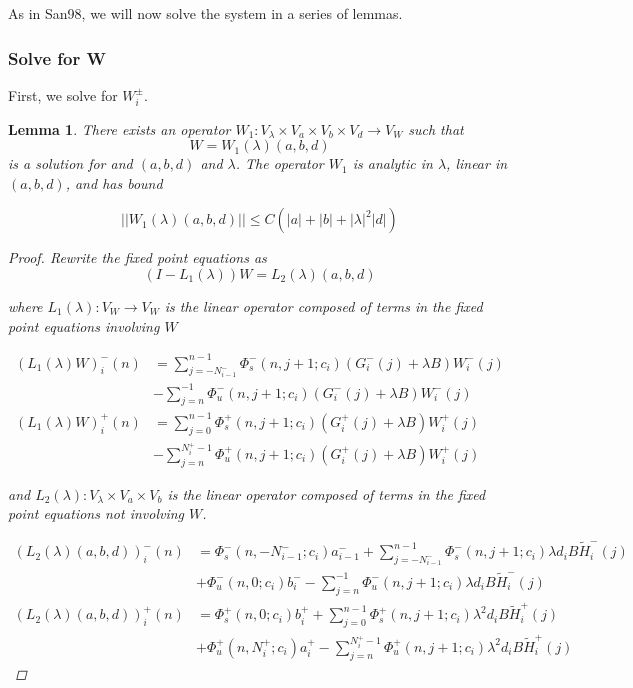 \documentclass[12pt]{article}
\newtheorem{lemma}{Lemma}
\begin{document}
As in San98, we will now solve the system in a series of lemmas.

\subsubsection{Solve for W}

First, we solve for $W_i^\pm$. 


\begin{lemma}\label{inv1}
There exists an operator $W_1: V_\lambda \times V_a \times V_b \times V_d \rightarrow V_W$ such that
\[
W = W_1(\lambda)(a,b,d)
\]
is a solution for and $(a,b,d)$ and $\lambda$. The operator $W_1$ is analytic in $\lambda$, linear in $(a,b,d)$, and has bound

\begin{equation}\label{W1bound}
||W_1(\lambda)(a,b,d)|| \leq C \left( |a| + |b| + |\lambda|^2 |d| \right)
\end{equation}

\begin{proof}
Rewrite the fixed point equations as
\[
(I - L_1(\lambda))W = L_2(\lambda)(a,b,d)
\]

where $L_1(\lambda): V_W \rightarrow V_W$ is the linear operator composed of terms in the fixed point equations involving $W$

\begin{align*}
(L_1(\lambda)W)_i^-(n) &= \sum_{j = -N_{i-1}^-}^{n-1} \Phi_s^-(n, j+1; c_i)
(G_i^-(j) + \lambda B) W_i^-(j) \\&- \sum_{j = n}^{-1} \Phi_u^-(n, j+1; c_i) 
(G_i^-(j) + \lambda B) W_i^-(j)\\
(L_1(\lambda)W)_i^+(n) &= \sum_{j = 0}^{n-1} \Phi_s^+(n, j+1; c_i) 
(G_i^+(j) + \lambda B) W_i^+(j) \\
&-\sum_{j = n}^{N_i^+-1} \Phi_u^+(n, j+1; c_i) 
(G_i^+(j) + \lambda B) W_i^+(j)
\end{align*}

and $L_2(\lambda): V_\lambda \times V_a \times V_b $ is the linear operator composed of terms in the fixed point equations not involving $W$.

\begin{align*}
(L_2(\lambda)(a,b,d))_i^-(n) &= 
\Phi_s^-(n, -N_{i-1}^-; c_i) a_{i-1}^- + \sum_{j = -N_{i-1}^-}^{n-1} \Phi_s^-(n, j+1; c_i)
\lambda d_i B \tilde{H}_i^-(j)
 \\
&+ \Phi_u^-(n, 0; c_i) b_i^- - \sum_{j = n}^{-1} \Phi_u^-(n, j+1; c_i) 
\lambda d_i B \tilde{H}_i^-(j) \\
(L_2(\lambda)(a,b,d))_i^+(n) &= \Phi_s^+(n, 0; c_i) b_i^+ + \sum_{j = 0}^{n-1} \Phi_s^+(n, j+1; c_i)\lambda^2 d_i B \tilde{H}_i^+(j) \\
&+ \Phi_u^+(n, N_i^+; c_i) a_i^+ - \sum_{j = n}^{N_i^+-1} \Phi_u^+(n, j+1; c_i)\lambda^2 d_i B \tilde{H}_i^+(j)
\end{align*}


\end{proof}
\end{lemma}
\end{document}
